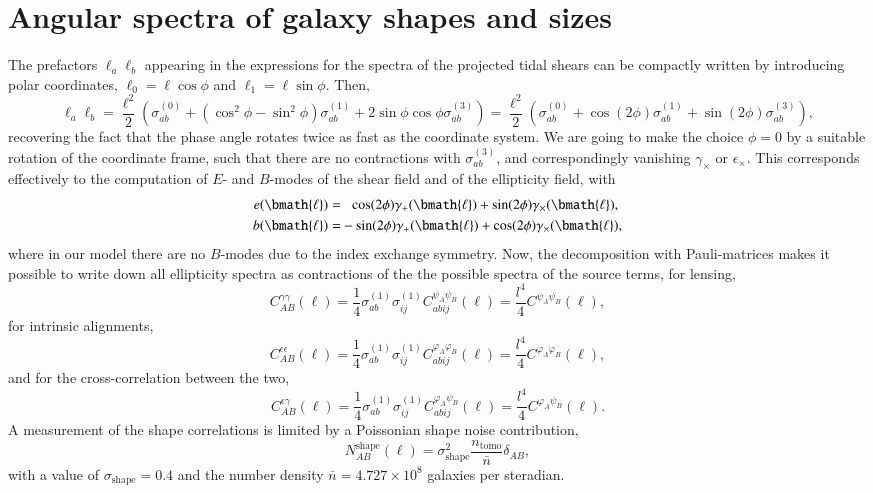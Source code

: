 \documentclass[a4paper,fleqn,usenatbib]{mnras}
\newcommand{\vecl}{\bmath{\ell}}
\begin{document}
\section{Angular spectra of galaxy shapes and sizes}\label{sect_spectra}
The prefactors $\ell_a\ell_b$ appearing in the expressions for the spectra of the projected tidal shears can be compactly written by introducing polar coordinates, $\ell_0 = \ell\cos\phi$ and $\ell_1 = \ell\sin\phi$. Then,
\begin{equation}
\ell_a\ell_b = 
\frac{\ell^2}{2}\left(\sigma^{(0)}_{ab} + (\cos^2\phi-\sin^2\phi)\sigma^{(1)}_{ab} + 2\sin\phi\cos\phi\sigma^{(3)}_{ab}\right) = 
\frac{\ell^2}{2}\left(\sigma^{(0)}_{ab} + \cos(2\phi)\sigma^{(1)}_{ab} + \sin(2\phi)\sigma^{(3)}_{ab}\right),
\end{equation}
recovering the fact that the phase angle rotates twice as fast as the coordinate system. We are going to make the choice $\phi = 0$ by a suitable rotation of the coordinate frame, such that there are no contractions with $\sigma^{(3)}_{ab}$, and correspondingly vanishing $\gamma_\times$ or $\epsilon_\times$. This corresponds effectively to the computation of $E$- and $B$-modes of the shear field and of the ellipticity field, with
\begin{align}
e(\vecl) = &\hphantom{-}\cos(2\phi)\gamma_+(\vecl) + \sin(2\phi)\gamma_\times(\vecl),\\
b(\vecl) = &-\sin(2\phi)\gamma_+(\vecl) + \cos(2\phi)\gamma_\times(\vecl),
\end{align}
where in our model there are no $B$-modes due to the index exchange symmetry. Now, the decomposition with Pauli-matrices makes it possible to write down all ellipticity spectra as contractions of the the possible spectra of the source terms, for lensing,
\begin{equation}
C^{\gamma\gamma}_{AB}(\ell) = \frac{1}{4}\sigma^{(1)}_{ab}\sigma^{(1)}_{ij}C^{\psi_A\psi_B}_{abij}(\ell) = \frac{l^4}{4}C^{\psi_A\psi_B}(\ell),
\end{equation}
for intrinsic alignments,
\begin{equation}
C^{\epsilon\epsilon}_{AB}(\ell) = \frac{1}{4}\sigma^{(1)}_{ab}\sigma^{(1)}_{ij}C^{\varphi_A\varphi_B}_{abij}(\ell) = \frac{l^4}{4}C^{\varphi_A\varphi_B}(\ell),
\end{equation}
and for the cross-correlation between the two,
\begin{equation}
C^{\epsilon\gamma}_{AB}(\ell) = \frac{1}{4}\sigma^{(1)}_{ab}\sigma^{(1)}_{ij}C^{\varphi_A\psi_B}_{abij}(\ell) = \frac{l^4}{4}C^{\varphi_A\psi_B}(\ell).
\end{equation}
A measurement of the shape correlations is limited by a Poissonian shape noise contribution,
\begin{equation}
N_{AB}^\mathrm{shape}(\ell) = \sigma^2_\mathrm{shape}\frac{n_\mathrm{tomo}}{\bar{n}}\delta_{AB},
\end{equation}
with a value of $\sigma_\mathrm{shape} = 0.4$ and the number density $\bar{n} = 4.727\times 10^8$ galaxies per steradian.
\end{document}
